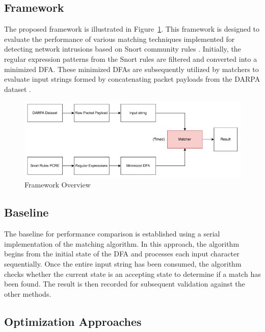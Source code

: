 \documentclass[sigconf]{acmart}
\begin{document}
\subsection{Framework}

The proposed framework is illustrated in Figure~\ref{fig:Framework}. This framework is designed to evaluate the performance of various matching techniques implemented for detecting network intrusions based on Snort community rules \cite{snortRules}. Initially, the regular expression patterns from the Snort rules are filtered and converted into a minimized DFA. These minimized DFAs are subsequently utilized by matchers to evaluate input strings formed by concatenating packet payloads from the DARPA dataset \cite{DARPA}.


\begin{figure}[t]
	\centering
	\includegraphics[width=\linewidth]{framework}
	\caption{Framework Overview}
	\label{fig:Framework}
\end{figure}

\subsection{Baseline}

The baseline for performance comparison is established using a serial implementation of the matching algorithm. In this approach, the algorithm begins from the initial state of the DFA and processes each input character sequentially. Once the entire input string has been consumed, the algorithm checks whether the current state is an accepting state to determine if a match has been found. The result is then recorded for subsequent validation against the other methods.

\subsection{Optimization Approaches}
\end{document}
